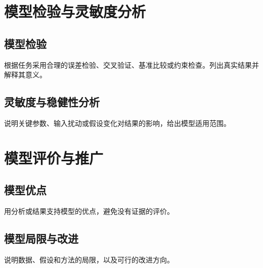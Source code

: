 \section{模型检验与灵敏度分析}
\subsection{模型检验}
根据任务采用合理的误差检验、交叉验证、基准比较或约束检查。列出真实结果并解释其意义。
\subsection{灵敏度与稳健性分析}
说明关键参数、输入扰动或假设变化对结果的影响，给出模型适用范围。

\section{模型评价与推广}
\subsection{模型优点}
用分析或结果支持模型的优点，避免没有证据的评价。
\subsection{模型局限与改进}
说明数据、假设和方法的局限，以及可行的改进方向。
